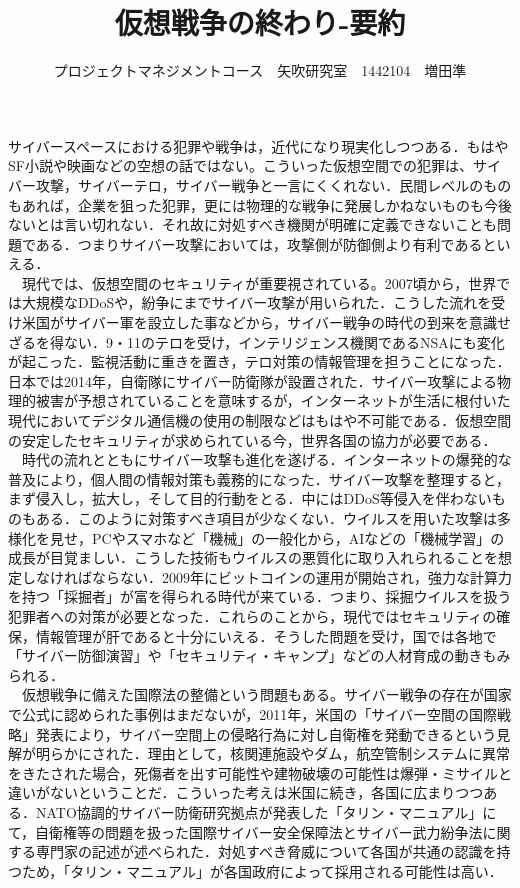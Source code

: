 \documentclass[uplatex,twocolumn,dvipdfmx]{jsarticle}
\title{\vspace{-5mm}\fontsize{14pt}{0pt}\selectfont 仮想戦争の終わり-要約}
\author{\normalsize プロジェクトマネジメントコース　矢吹研究室　1442104　増田準}
\date{}
\begin{document}
\fontsize{10.5pt}{\baselineskip}\selectfont
\maketitle





サイバースペースにおける犯罪や戦争は，近代になり現実化しつつある．もはやSF小説や映画などの空想の話ではない。こういった仮想空間での犯罪は、サイバー攻撃，サイバーテロ，サイバー戦争と一言にくくれない．民間レベルのものもあれば，企業を狙った犯罪，更には物理的な戦争に発展しかねないものも今後ないとは言い切れない．それ故に対処すべき機関が明確に定義できないことも問題である．つまりサイバー攻撃においては，攻撃側が防御側より有利であるといえる．\\
　現代では、仮想空間のセキュリティが重要視されている。2007頃から，世界では大規模なDDoSや，紛争にまでサイバー攻撃が用いられた．こうした流れを受け米国がサイバー軍を設立した事などから，サイバー戦争の時代の到来を意識せざるを得ない．9・11のテロを受け，インテリジェンス機関であるNSAにも変化が起こった．監視活動に重きを置き，テロ対策の情報管理を担うことになった．日本では2014年，自衛隊にサイバー防衛隊が設置された．サイバー攻撃による物理的被害が予想されていることを意味するが，インターネットが生活に根付いた現代においてデジタル通信機の使用の制限などはもはや不可能である．仮想空間の安定したセキュリティが求められている今，世界各国の協力が必要である．\\
　時代の流れとともにサイバー攻撃も進化を遂げる．インターネットの爆発的な普及により，個人間の情報対策も義務的になった．サイバー攻撃を整理すると，まず侵入し，拡大し，そして目的行動をとる．中にはDDoS等侵入を伴わないものもある．このように対策すべき項目が少なくない．ウイルスを用いた攻撃は多様化を見せ，PCやスマホなど「機械」の一般化から，AIなどの「機械学習」の成長が目覚ましい．こうした技術もウイルスの悪質化に取り入れられることを想定しなければならない．2009年にビットコインの運用が開始され，強力な計算力を持つ「採掘者」が富を得られる時代が来ている．つまり、採掘ウイルスを扱う犯罪者への対策が必要となった．これらのことから，現代ではセキュリティの確保，情報管理が肝であると十分にいえる．そうした問題を受け，国では各地で「サイバー防御演習」や「セキュリティ・キャンプ」などの人材育成の動きもみられる．\\
　仮想戦争に備えた国際法の整備という問題もある。サイバー戦争の存在が国家で公式に認められた事例はまだないが，2011年，米国の「サイバー空間の国際戦略」発表により，サイバー空間上の侵略行為に対し自衛権を発動できるという見解が明らかにされた．理由として，核関連施設やダム，航空管制システムに異常をきたされた場合，死傷者を出す可能性や建物破壊の可能性は爆弾・ミサイルと違いがないということだ．こういった考えは米国に続き，各国に広まりつつある．NATO協調的サイバー防衛研究拠点が発表した「タリン・マニュアル」にて，自衛権等の問題を扱った国際サイバー安全保障法とサイバー武力紛争法に関する専門家の記述が述べられた．対処すべき脅威について各国が共通の認識を持つため，「タリン・マニュアル」が各国政府によって採用される可能性は高い．\\
\end{document}
